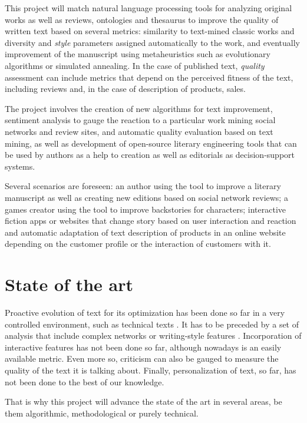 \documentclass[a4paper]{article}
\begin{document}
This project will match natural language processing tools for
analyzing original works as well as reviews, ontologies and thesaurus
to improve the quality of written text based on several metrics: similarity to
text-mined classic works and diversity and {\em style} parameters
assigned automatically to the work, and eventually improvement of the
manuscript using metaheuristics such as evolutionary algorithms or
simulated annealing. In the case of published text, {\em quality}
assessment can include metrics that depend on the perceived fitness of
the text, including reviews and, in the case of description of
products, sales.

The project involves the creation of new algorithms for text
improvement, sentiment analysis to gauge the reaction to a particular
work mining social networks and review sites, and automatic quality
evaluation based on text mining, as well as development of open-source
literary engineering tools that can be used by authors as a help to
creation as well as editorials as decision-support systems.  

Several scenarios are foreseen: an author using the tool to improve a
literary manuscript as well as creating new editions based on social
network reviews; a games creator using the tool to improve backstories
for characters; interactive fiction apps or websites that change story
based on user interaction and reaction and automatic adaptation of
text description of products in an online website depending on the
customer profile or the interaction of customers with it. 

\section{State of the art}

Proactive evolution of text for its optimization has been done so far
in a very controlled environment, such as technical texts
\cite{Rascu06acontrolled,hernandez2004checking}. It has to be preceded by a set of analysis
that include complex networks
\cite{1367-2630-14-4-043029,0295-5075-100-5-58002} or writing-style
features \cite{ASI:ASI20316}. Incorporation of interactive features
has not been done so far, although nowadays is an easily available
metric. Even more so, criticism can also be gauged to measure the
quality of the text it is talking about. Finally, personalization of
text, so far, has not been done to the best of our knowledge.

That is why this project will advance the state of the art in several
areas, be them algorithmic, methodological or purely technical.
\end{document}
